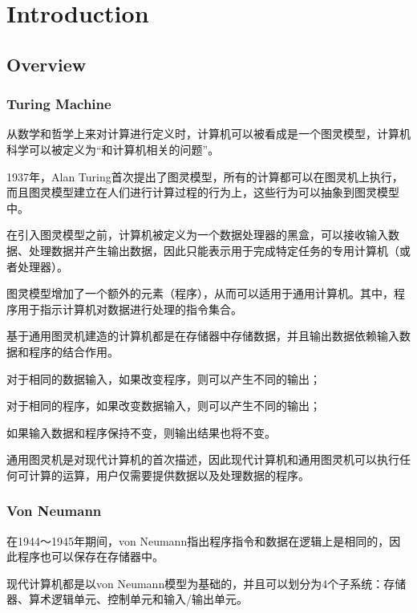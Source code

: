 \part{Introduction}

\chapter{Overview}


\section{Turing Machine}

从数学和哲学上来对计算进行定义时，计算机可以被看成是一个图灵模型，计算机科学可以被定义为“和计算机相关的问题”。

1937年，Alan Turing首次提出了图灵模型，所有的计算都可以在图灵机上执行，而且图灵模型建立在人们进行计算过程的行为上，这些行为可以抽象到图灵模型中。

在引入图灵模型之前，计算机被定义为一个数据处理器的黑盒，可以接收输入数据、处理数据并产生输出数据，因此只能表示用于完成特定任务的专用计算机（或者处理器）。

图灵模型增加了一个额外的元素（程序），从而可以适用于通用计算机。其中，程序用于指示计算机对数据进行处理的指令集合。

基于通用图灵机建造的计算机都是在存储器中存储数据，并且输出数据依赖输入数据和程序的结合作用。

\begin{compactitem}
\item 对于相同的数据输入，如果改变程序，则可以产生不同的输出；
\item 对于相同的程序，如果改变数据输入，则可以产生不同的输出；
\item 如果输入数据和程序保持不变，则输出结果也将不变。
\end{compactitem}

通用图灵机是对现代计算机的首次描述，因此现代计算机和通用图灵机可以执行任何可计算的运算，用户仅需要提供数据以及处理数据的程序。



\section{Von Neumann}




在1944～1945年期间，von Neumann指出程序指令和数据在逻辑上是相同的，因此程序也可以保存在存储器中。

现代计算机都是以von Neumann模型为基础的，并且可以划分为4个子系统：存储器、算术逻辑单元、控制单元和输入/输出单元。

